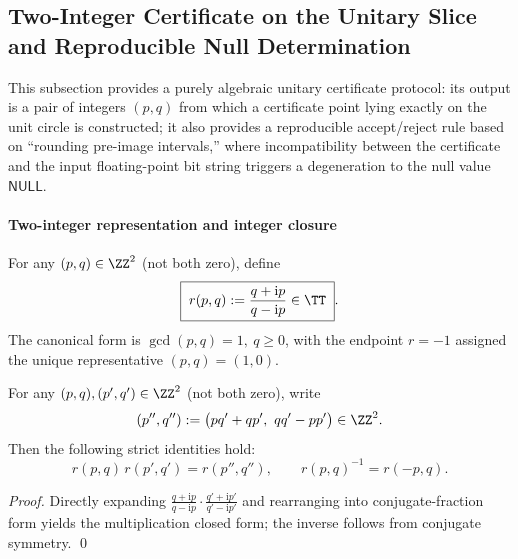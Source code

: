 \subsection{Two-Integer Certificate on the Unitary Slice and Reproducible Null Determination}\label{subsec:unitary-two-integer-certificate}
This subsection provides a purely algebraic unitary certificate protocol: its output is a pair of integers \((p,q)\) from which a certificate point lying exactly on the unit circle is constructed; it also provides a reproducible accept/reject rule based on ``rounding pre-image intervals,'' where incompatibility between the certificate and the input floating-point bit string triggers a degeneration to the null value \(\mathsf{NULL}\).

\paragraph{Two-integer representation and integer closure}
\begin{definition}\label{def:unitary-two-integer-certificate}
For any \((p,q)\in\ZZ^{2}\) (not both zero), define
\begin{equation}\label{eq:unitary-two-integer-map}
\boxed{\;
r(p,q):=\frac{q+\mathrm{i}p}{q-\mathrm{i}p}\in\TT\; }.
\end{equation}
The canonical form is
\(
\gcd(p,q)=1,\ q\ge 0
\), with the endpoint \(r=-1\) assigned the unique representative \((p,q)=(1,0)\).
\end{definition}

\begin{proposition}\label{prop:unitary-two-integer-closure}
For any \((p,q),(p',q')\in\ZZ^{2}\) (not both zero), write
\[
(p'',q''):=\bigl(pq'+qp',\ qq'-pp'\bigr)\in\ZZ^{2}.
\]
Then the following strict identities hold:
\[
r(p,q)\,r(p',q')=r(p'',q''),
\qquad
r(p,q)^{-1}=r(-p,q).
\]
\end{proposition}
\begin{proof}
Directly expanding
\(
\frac{q+\mathrm{i}p}{q-\mathrm{i}p}\cdot\frac{q'+\mathrm{i}p'}{q'-\mathrm{i}p'}
\)
and rearranging into conjugate-fraction form yields the multiplication closed form; the inverse follows from conjugate symmetry. \qed
\end{proof}

